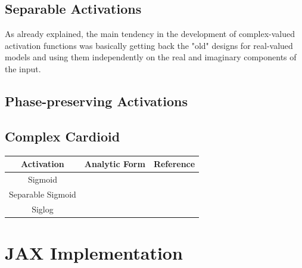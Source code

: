 \documentclass[../main.tex]{subfiles}
\begin{document}
\subsection*{Separable Activations}
As already explained, the main tendency in the development of complex-valued activation functions was basically getting back the "old" designs for real-valued models and using them independently on the real and imaginary components of the input.


\subsection*{Phase-preserving Activations}

\subsection*{Complex Cardioid}

\begin{table}[!ht]
\centering
\begin{tabular}{c c c}
\toprule
\textbf{Activation} & \textbf{Analytic Form} & \textbf{Reference}\\
\midrule
Sigmoid \\
Separable Sigmoid\\
Siglog\\

\bottomrule
\end{tabular}
\end{table}

\section{JAX Implementation}

\end{document}
